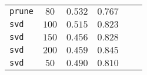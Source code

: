 \begin{table}[tbh]
\begin{tabular}{lccccc}
\texttt{prune}               &      $80$\textsuperscript{} &   $0.532$\textsuperscript{} &   $0.767$\textsuperscript{} \\
\texttt{svd}                 &     $100$\textsuperscript{} &   $0.515$\textsuperscript{} &   $0.823$\textsuperscript{} \\
\texttt{svd}                 &     $150$\textsuperscript{} &   $0.456$\textsuperscript{} &   $0.828$\textsuperscript{} \\
\texttt{svd}                 &     $200$\textsuperscript{} &   $0.459$\textsuperscript{} &   $0.845$\textsuperscript{} \\
\texttt{svd}                 &      $50$\textsuperscript{} &   $0.490$\textsuperscript{} &   $0.810$\textsuperscript{} \\
\bottomrule
\end{tabular}

        \end{table}